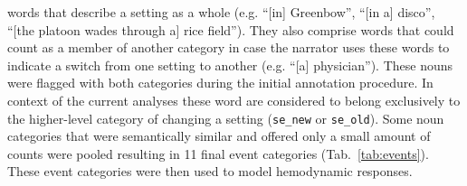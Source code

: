 \documentclass[english]{article}
\begin{document}
words that describe a setting as a whole (e.g. ``[in] Greenbow'', ``[in a]
disco'', ``[the platoon wades through a] rice field''). They also comprise words
that could count as a member of another category in case the narrator uses
these words to indicate a switch from one setting to another (e.g. ``[a]
physician'').
These nouns were flagged with both categories during the initial annotation
procedure. In context of the current analyses these word are considered to
belong exclusively to the higher-level category of changing a setting
(\texttt{se\_new} or \texttt{se\_old}).
Some noun categories that were semantically similar and offered only a small
amount of counts were pooled resulting in 11 final event categories (Tab.~\ref{tab:events}).
These event categories were then used to model hemodynamic
responses.
\end{document}
